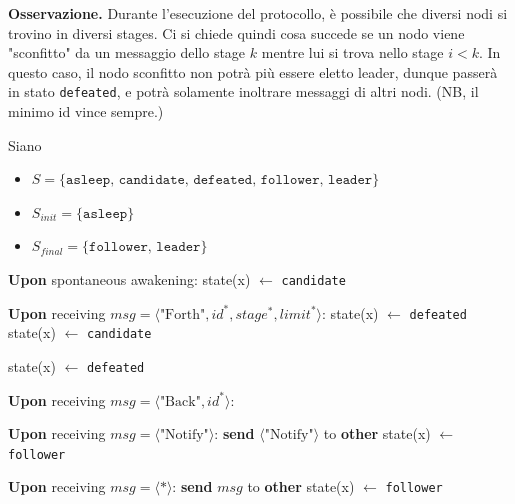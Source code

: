 \textbf{Osservazione.} Durante l'esecuzione del protocollo, è possibile che diversi nodi si trovino in diversi stages. Ci si chiede quindi cosa succede se un nodo viene "sconfitto" da un messaggio dello stage $k$ mentre lui si trova nello stage $i < k$. In questo caso, il nodo sconfitto non potrà più essere eletto leader, dunque passerà in stato \texttt{defeated}, e potrà solamente inoltrare messaggi di altri nodi. (NB, il minimo id vince sempre.)

Siano
\begin{itemize}
    \item $S = \{\texttt{asleep, candidate, defeated, follower, leader}\}$
    \item $S_{init} = \{\texttt{asleep}\}$
    \item $S_{final} = \{\texttt{follower, leader}\}$
\end{itemize}

\begin{algorithm}
\caption{Stage Technique}
\begin{algorithmic}[1]
    \Statex \textbf{Upon} spontaneous awakening:
        \State {}
        \State state(x) $\gets$ \texttt{candidate}
    \EndIf

    \Statex
    \Statex \textbf{Upon} receiving $msg = \langle \text{"Forth"}, id^*, stage^*, limit^*\rangle$:
            \State {}
            \State state(x) $\gets$ \texttt{defeated}
        \Else
            \State {}
            \State state(x) $\gets$ \texttt{candidate}
        \EndIf
    \EndIf
    
    \Statex
                \State {}
                \State state(x) $\gets$ \texttt{defeated}
            \Else 
                    \State {}
                \EndIf
            \EndIf
    \EndIf

    \Statex
    \Statex \textbf{Upon} receiving $msg = \langle \text{"Back"}, id^*\rangle$:
            \State {}
        \EndIf
    \EndIf

    \Statex
    \Statex \textbf{Upon} receiving $msg = \langle \text{"Notify"}\rangle$:
        \State \textbf{send} $\langle \text{"Notify"}\rangle$ to \textbf{other}
        \State state(x) $\gets$ \texttt{follower}
    \EndIf

    \Statex
    \Statex \textbf{Upon} receiving $msg = \langle *\rangle$:
        \State \textbf{send} $msg$ to \textbf{other}
            \State state(x) $\gets$ \texttt{follower}
        \EndIf
    \EndIf

\end{algorithmic}
\end{algorithm}

